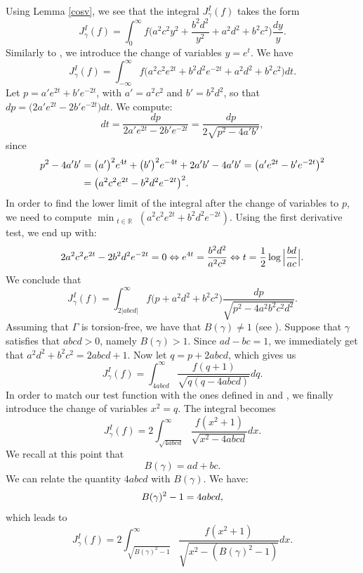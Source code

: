 \documentclass[a4paper,11pt]{amsart}
\theoremstyle{definition}
\begin{document}
Using Lemma \ref{cosv}, we see that the integral $J_\gamma^I(f)$ takes the form
$$J_{\gamma}^I(f)=\int_{0}^{\infty} f\Bigg(a^2c^2y^2+\frac{b^2d^2}{y^2}+a^2d^2+b^2c^2\Bigg)\frac{dy}{y}.$$
Similarly to \cite[p.~9]{MMW}, we introduce the change of variables $y=e^t$. We have
$$ J_{\gamma}^I(f)= \int_{-\infty}^{\infty}f\big(a^2c^2e^{2t}+b^2d^2e^{-2t}+a^2d^2+b^2c^2\big)dt.$$
Let $p=a'e^{2t}+b'e^{-2t}$, with $a'=a^2c^2$ and $b'=b^2d^2$, so that $dp=\big(2a'e^{2t}-2b'e^{-2t}\big)dt$. We compute:
$$dt=\frac{dp}{2a'e^{2t}-2b'e^{-2t}}= \frac{dp}{2\sqrt{p^2-4a'b'}},$$
since
\begin{align}
    p^2-4a'b' &= \big(a'\big)^2e^{4t}+\big(b'\big)^2e^{-4t}+2a'b'-4a'b'= \big(a'e^{2t}-b'e^{-2t}\big)^2\notag \\
    &= \big(a^2c^2e^{2t}-b^2d^2e^{-2t}\big)^2 \notag.
\end{align}
In order to find the lower limit of the integral after the change of variables to $p$, we need to compute
$\min_{\substack{t \in \mathbb{R}}}(a^2c^2e^{2t}+b^2d^2e^{-2t})$. Using the first derivative test, we end up with:
\begin{align} \notag
    2a^2c^2e^{2t}-2b^2d^2e^{-2t} =0 \Leftrightarrow
    e^{4t} = \frac{b^2d^2}{a^2c^2} \Leftrightarrow
    t = \frac{1}{2}\log \Big|\frac{bd}{ac}\Big|. \notag
\end{align}
We conclude that
$$J_{\gamma}^I(f)= \int_{2|abcd|}^{\infty} f\big(p+a^2d^2+b^2c^2\big) \frac{dp}{\sqrt{p^2-4a^2b^2c^2d^2}}.$$
Assuming that $\Gamma$ is torsion-free, we have that $B(\gamma)\neq 1$ (see \cite[Lemma 8]{Tsuz}).
Suppose that $\gamma$ satisfies that $abcd>0$, namely $B(\gamma)>1$. Since $ad-bc=1$, we immediately get that $a^2d^2+b^2c^2= 2abcd+1$. Now let $q=p+2abcd$, which gives us
$$ J_{\gamma}^I(f)=\int_{4abcd}^{\infty}\frac{f(q+1)}{\sqrt{q(q-4abcd)}}dq.$$
In order to match our test function with the ones defined in \cite{Hu98} and \cite{CP}, we finally introduce the change of variables $x^2=q$. %
The integral becomes
$$ J_{\gamma}^I(f)=2 \int_{\sqrt{4abcd}}^{\infty}\frac{f(x^2+1)}{\sqrt{x^2-4abcd}}dx.$$
We recall at this point that  $$B(\gamma)=ad+bc.$$
We can relate the quantity $4abcd$ with $B(\gamma)$. We have:
\begin{align}
  \begin{split}
 B(\gamma)^2-1= 4abcd, \notag
  \end{split}
\end{align}
which leads to
$$ J_{\gamma}^I(f)= 2\int_{\sqrt{B(\gamma)^2-1}}^{\infty}\frac{f(x^2+1)}{\sqrt{x^2-(B(\gamma)^2-1)}}dx.$$
\end{document}
